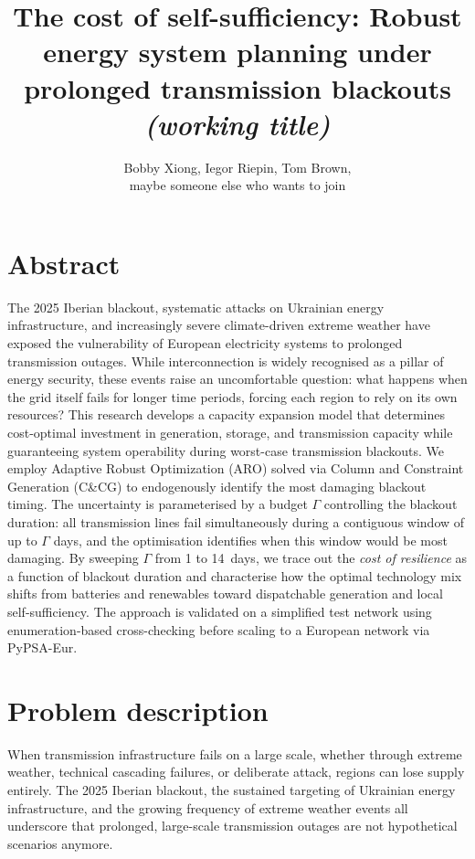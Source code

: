 \documentclass[11pt, a4paper]{article}
\title{The cost of self-sufficiency: Robust energy system planning under prolonged transmission blackouts \textit{(working title)}}
\author{Bobby Xiong, Iegor Riepin, Tom Brown,\\maybe someone else who wants to join}
\date{}
\begin{document}
\maketitle

\section{Abstract}
The 2025 Iberian blackout, systematic attacks on Ukrainian energy infrastructure, and increasingly severe climate-driven extreme weather have exposed the vulnerability of European electricity systems to prolonged transmission outages. While interconnection is widely recognised as a pillar of energy security, these events raise an uncomfortable question: what happens when the grid itself fails for longer time periods, forcing each region to rely on its own resources? This research develops a capacity expansion model that determines cost-optimal investment in generation, storage, and transmission capacity while guaranteeing system operability during worst-case transmission blackouts. We employ Adaptive Robust Optimization (ARO) solved via Column and Constraint Generation (C\&CG) to endogenously identify the most damaging blackout timing. The uncertainty is parameterised by a budget $\Gamma$ controlling the blackout duration: all transmission lines fail simultaneously during a contiguous window of up to $\Gamma$ days, and the optimisation identifies when this window would be most damaging. By sweeping $\Gamma$ from 1 to 14~days, we trace out the \emph{cost of resilience} as a function of blackout duration and characterise how the optimal technology mix shifts from batteries and renewables toward dispatchable generation and local self-sufficiency. The approach is validated on a simplified test network using enumeration-based cross-checking before scaling to a European network via PyPSA-Eur.

\section{Problem description}
When transmission infrastructure fails on a large scale, whether through extreme weather, technical cascading failures, or deliberate attack, regions can lose supply entirely. The 2025 Iberian blackout, the sustained targeting of Ukrainian energy infrastructure, and the growing frequency of extreme weather events all underscore that prolonged, large-scale transmission outages are not hypothetical scenarios anymore.
\end{document}
